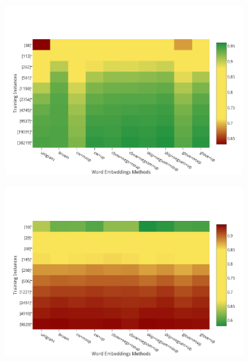 \begin{figure}
\caption{Best results for each method for POS-Tagging and Chunking. The x-axis correspond to the different word embeddings methods and the y-axis to the 10 training partitions at log scale. Green color stand for high performance, while red color stands for low performance. The methods are in chronological order}
\centering
\begin{subfigure}{7cm}
	\centering
    \includegraphics[scale=0.4]{plots/map-pos-color}    	
\end{subfigure}
\begin{subfigure}{7cm}
	\centering
    \includegraphics[scale=0.4]{plots/map-chunk-color}
\end{subfigure}

\end{figure}
